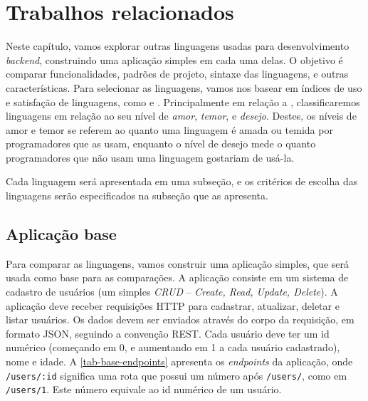 
\chapter{Trabalhos relacionados}\label{chapter:trabalhos-relacionados}

Neste capítulo, vamos explorar outras linguagens usadas para desenvolvimento \textit{backend},
construindo uma aplicação simples em cada uma delas. O objetivo é comparar funcionalidades,
padrões de projeto, sintaxe das linguagens, e outras características. Para selecionar
as linguagens, vamos nos basear em índices de uso e satisfação de linguagens, como \cite{tiobeindex}
e \cite{stackoverflowsurvey}. Principalmente em relação a \cite{stackoverflowsurvey}, classificaremos
linguagens em relação ao seu nível de \textit{amor}, \textit{temor}, e \textit{desejo}. Destes, os
níveis de amor e temor se referem ao quanto uma linguagem é amada ou temida por programadores que as
usam, enquanto o nível de desejo mede o quanto programadores que não usam uma linguagem gostariam de
usá-la.

Cada linguagem será apresentada em uma subseção, e os critérios de escolha das linguagens
serão especificados na subseção que as apresenta.

\section{Aplicação base}\label{sec:aplicacao-base}

Para comparar as linguagens, vamos construir uma aplicação simples, que será usada
como base para as comparações. A aplicação consiste em um sistema de cadastro de
usuários (um simples \textit{CRUD} -- \textit{Create, Read, Update, Delete}). A
aplicação deve receber requisições HTTP para cadastrar, atualizar, deletar e listar
usuários. Os dados devem ser enviados através do corpo da requisição, em formato
JSON, seguindo a convenção REST. Cada usuário deve ter um id numérico (começando
em 0, e aumentando em 1 a cada usuário cadastrado), nome e idade. A
\autoref{tab-base-endpoints} apresenta os \textit{endpoints} da aplicação, onde
\texttt{/users/:id} significa uma rota que possui um número após \texttt{/users/},
como em \texttt{/users/1}. Este número equivale ao id numérico de um usuário.


